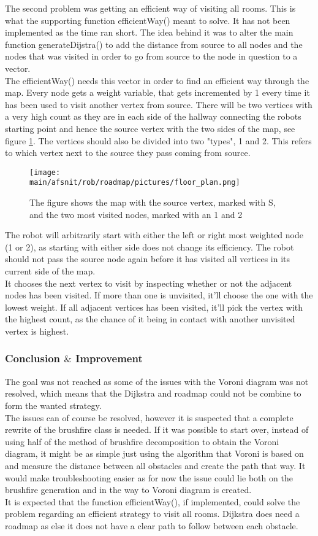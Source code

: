 \documentclass[../../../Main.tex]{subfiles}
\begin{document}
The second problem was getting an efficient way of visiting all rooms. This is what the supporting function efficientWay() meant to solve. It has not been implemented as the time ran short. The idea behind it was to alter the main function generateDijstra() to add the distance from source to all nodes and the nodes that was visited in order to go from source to the node in question to a vector. \\
The efficientWay() needs this vector in order to find an efficient way through the map. Every node gets a weight variable, that gets incremented by 1 every time it has been used to visit another vertex from source. There will be two vertices with a very high count as they are in each side of the hallway connecting the robots starting point and hence the source vertex with the two sides of the map, see figure \ref{fig:map_node1}. The vertices should also be divided into two "types", 1 and 2. This refers to which vertex next to the source they pass coming from source.
\begin{figure}[H]
  \centering
  \texttt{[image: \\main/afsnit/rob/roadmap/pictures/floor\_plan.png]}
  \caption{The figure shows the map with the source vertex, marked with S, and the two most visited nodes, marked with an 1 and 2}
  \label{fig:map_node1}
\end{figure}
The robot will arbitrarily start with either the left or right most weighted node (1 or 2), as starting with either side does not change its efficiency.
The robot should not pass the source node again before it has visited all vertices in its current side of the map.\\
It chooses the next vertex to visit by inspecting whether or not the adjacent nodes has been visited.
If more than one is unvisited, it'll choose the one with the lowest weight.
If all adjacent vertices has been visited, it'll pick the vertex with the highest count, as the chance of it being in contact with another unvisited vertex is highest.\\

\subsubsection{Conclusion $\&$ Improvement}
The goal was not reached as some of the issues with the Voroni diagram was not resolved, which means that the Dijkstra and roadmap could not be combine to form the wanted strategy.\\
The issues can of course be resolved, however it is suspected that a complete rewrite of the brushfire class is needed.
If it was possible to start over, instead of using half of the method of brushfire decomposition to obtain the Voroni diagram, it might be as simple just using the algorithm that Voroni is based on and measure the distance between all obstacles and create the path that way.
It would make troubleshooting easier as for now the issue could lie both on the brushfire generation and in the way to Voroni diagram is created. \\
It is expected that the function efficientWay(), if implemented, could solve the problem regarding an efficient strategy to visit all rooms. Dijkstra does need a roadmap as else it does not have a clear path to follow between each obstacle.
\end{document}
